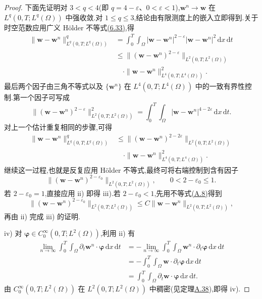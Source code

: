 \begin{lemma}[收敛子列的存在性]
\begin{proof}
下面先证明对 $3<q<4$(即 $q=4-\varepsilon$、$0<\varepsilon<1$),$\bm{w}^n\to\bm{w}$ 在 $L^q(0,T;L^q(\Omega))$ 中强收敛.对 $1\le q\le3$,结论由有限测度上的嵌入立即得到.关于时空范数应用广义 Hölder 不等式\hyperref[eq:steady-ns-generalized-holder]{(6.33)},得
\[
\begin{aligned}
 \|\bm{w}-\bm{w}^n\|_{L^q(0,T;L^q(\Omega))}^q
 &=\int_0^T\int_\Omega
       |\bm{w}-\bm{w}^n|^{2-\varepsilon}
       |\bm{w}-\bm{w}^n|^2\,\mathrm{d}x\,\mathrm{d}t\\
 &\le
   \|(\bm{w}-\bm{w}^n)^{2-\varepsilon}
       \|_{L^2(0,T;L^2(\Omega))}\\
 &\quad\cdot
   \|\bm{w}-\bm{w}^n\|_{L^4(0,T;L^4(\Omega))}^2.
\end{aligned}
\]
最后两个因子由三角不等式以及 $\{\bm{w}^n\}$ 在 $L^4(0,T;L^4(\Omega))$ 中的一致有界性控制.第一个因子可写成
\[
 \|(\bm{w}-\bm{w}^n)^{2-\varepsilon}
          \|_{L^2(0,T;L^2(\Omega))}^2
 =\int_0^T\int_\Omega
      |\bm{w}-\bm{w}^n|^{4-2\varepsilon}
         \,\mathrm{d}x\,\mathrm{d}t.
\]
对上一个估计重复相同的步骤,可得
\[
\begin{aligned}
 \|\bm{w}-\bm{w}^n\|_{L^q(0,T;L^q(\Omega))}^q
 &\le
   \|(\bm{w}-\bm{w}^n)^{2-2\varepsilon}
        \|_{L^2(0,T;L^2(\Omega))}\\
 &\quad\cdot
   \|\bm{w}-\bm{w}^n\|_{L^4(0,T;L^4(\Omega))}^2.
\end{aligned}
\]
继续这一过程,也就是反复应用 Hölder 不等式,最终可将右端控制到含有因子
\[
 \|(\bm{w}-\bm{w}^n)^{2-\varepsilon_0}
       \|_{L^2(0,T;L^2(\Omega))},
 \qquad 0<2-\varepsilon_0\le1.
\]
若 $2-\varepsilon_0=1$,直接应用 ii) 即得 iii).若 $2-\varepsilon_0<1$,先用不等式\hyperref[eq:appendix-a-8]{(A.8)}得到
\[
 \|(\bm{w}-\bm{w}^n)^{2-\varepsilon_0}
       \|_{L^2(0,T;L^2(\Omega))}
 \le C\|\bm{w}-\bm{w}^n\|_{L^2(0,T;L^2(\Omega))},
\]
再由 ii) 完成 iii) 的证明.

iv) 对 $\symbf{\varphi}\in C_0^\infty(0,T;L^2(\Omega))$,利用 ii) 有
\[
\begin{aligned}
 \lim_{n\to\infty}\int_0^T\int_\Omega
       \partial_t\bm{w}^n\cdot\symbf{\varphi}\,
                  \mathrm{d}x\,\mathrm{d}t
 &=-\lim_{n\to\infty}\int_0^T\int_\Omega
       \bm{w}^n\cdot\partial_t\symbf{\varphi}\,
                  \mathrm{d}x\,\mathrm{d}t\\
 &=-\int_0^T\int_\Omega
       \bm{w}\cdot\partial_t\symbf{\varphi}\,
                  \mathrm{d}x\,\mathrm{d}t\\
 &=\int_0^T\int_\Omega
       \partial_t\bm{w}\cdot\symbf{\varphi}\,
                  \mathrm{d}x\,\mathrm{d}t.
\end{aligned}
\]
由 $C_0^\infty(0,T;L^2(\Omega))$ 在 $L^2(0,T;L^2(\Omega))$ 中稠密(见定理\hyperref[thm:appendix-a-38]{A.38}),即得 iv).


\end{proof}
\end{lemma}
